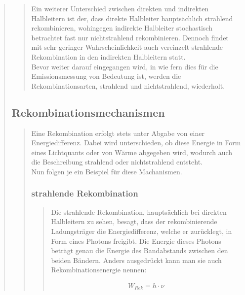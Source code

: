 \begin{quote}
\begin{quote}
\begin{quote}
            \end{quote}

            Ein weiterer Unterschied zwischen direkten und indirekten
            Halbleitern ist der, dass direkte Halbleiter hauptsächlich
            strahlend rekombinieren, wohingegen indirekte Halbleiter
            stochastisch betrachtet fast nur nichtstrahlend rekombinieren.
            Dennoch findet mit sehr geringer Wahrscheinlichkeit auch vereinzelt
            strahlende Rekombination in den indirekten Halbleitern statt.\\
            Bevor weiter darauf eingegangen wird, in wie fern dies für die
            Emissionsmessung von Bedeutung ist, werden die Rekombinationsarten,
            strahlend und nichtstrahlend, wiederholt.

        \end{quote}

        \subsection{Rekombinationsmechanismen}
        \begin{quote}

        Eine Rekombination erfolgt stets unter Abgabe von einer
        Energiedifferenz. Dabei wird unterschieden, ob diese Energie in Form
        eines Lichtquants oder von Wärme abgegeben wird, wodurch auch die
        Beschreibung strahlend oder nichtstrahlend entsteht.\\
        Nun folgen je ein Beispiel für diese Machanismen.

            \subsubsection{strahlende Rekombination}
            \begin{quote}

            Die strahlende Rekombination, hauptsächlich bei direkten Halbleitern
            zu sehen, besagt, dass der rekombinierende Ladungsträger die
            Energiedifferenz, welche er zurücklegt, in Form eines Photons
            freigibt. Die Energie dieses Photons beträgt genau die Energie des
            Bandabstands zwischen den beiden Bändern. Anders ausgedrückt kann
            man sie auch Rekombinationsenergie nennen:

            \begin{equation*}
                \begin{split}
                    W_{Rek} = h \cdot \nu
                \end{split}
            \end{equation*}


\end{quote}
\end{quote}
\end{quote}
